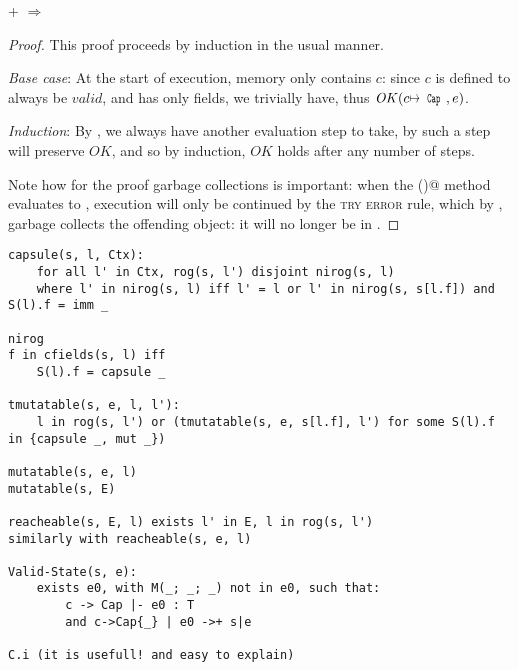 \begin{theorem}\rm
	 +  $\Rightarrow$ 
\end{theorem}
\begin{proof}
This proof proceeds by induction in the usual manner.

\emph{Base case}: At the start of execution, memory only contains $c$: since $c$ is defined to always be $\mathit{valid}$, and has only \Q@mut@ fields, we trivially have, thus $\mathit{OK}(c\mapsto\Kw{Cap},e)$.

\emph{Induction}: By , we always have another evaluation step to take, by  such a step will preserve $\mathit{OK}$, and so by induction, $\mathit{OK}$ holds after any number of steps.

Note how for the proof garbage collections is important:
when the \Q@invariant()@ method evaluates to \Q@false@,
execution will only be continued by the \textsc{try error} rule, which by , garbage collects the offending object: it will no longer be in \s.

\end{proof}

\bigskip
\begin{verbatim}
capsule(s, l, Ctx):
    for all l' in Ctx, rog(s, l') disjoint nirog(s, l)
    where l' in nirog(s, l) iff l' = l or l' in nirog(s, s[l.f]) and S(l).f = imm _

nirog
f in cfields(s, l) iff
    S(l).f = capsule _
	
tmutatable(s, e, l, l'):
    l in rog(s, l') or (tmutatable(s, e, s[l.f], l') for some S(l).f in {capsule _, mut _})

mutatable(s, e, l)
mutatable(s, E)

reacheable(s, E, l) exists l' in E, l in rog(s, l')
similarly with reacheable(s, e, l)
	
Valid-State(s, e):
    exists e0, with M(_; _; _) not in e0, such that:
        c -> Cap |- e0 : T
        and c->Cap{_} | e0 ->+ s|e

C.i (it is usefull! and easy to explain)
\end{verbatim}



\newenvironment{ienumerate}{${}$%
	\begin{itemize}\item[] %
	\begin{enumerate}
}{\end{enumerate}\end{itemize}}

